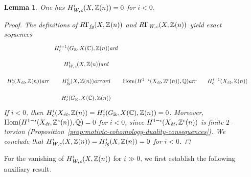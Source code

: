 \documentclass[leqno,12pt]{article}
\theoremstyle{plain}
\newtheorem{lemma}[theorem]{\indent\sc Lemma}
\theoremstyle{definition}
\DeclareMathOperator{\Hom}{Hom}
\newcommand{\CC}{\mathbb{C}}
\newcommand{\QQ}{\mathbb{Q}}
\newcommand{\RR}{\mathbb{R}}
\newcommand{\ZZ}{\mathbb{Z}}
\newcommand{\Wc}{\text{\it W,c}}
\newcommand{\ar}{\text{\it ar}}
\newcommand{\et}{\text{\it \'{e}t}}
\newcommand{\fg}{\text{\it fg}}
\begin{document}
\begin{lemma}
  One has $H^i_\Wc (X,\ZZ(n)) = 0$ for $i < 0$.

  \begin{proof}
    The definitions of $R\Gamma_\fg (X, \ZZ(n))$ and $R\Gamma_\Wc (X, \ZZ(n))$
    yield exact sequences
    \[ \begin{tikzcd}[row sep=1em,column sep=1em]
        &[-1em] H^{i-1}_c (G_\RR, X (\CC), \ZZ (n)) \ar{d} &[-1em] \\
        & H^i_\Wc (X, \ZZ(n)) \ar{d} \\
        H^i_c (X_\et, \ZZ(n)) \ar{r} & H^i_\fg (X, \ZZ(n)) \ar{r}\ar{d} & \Hom (H^{1-i} (X_\et, \ZZ^c (n)), \QQ) \ar{r} & H^{i+1}_c (X_\et, \ZZ(n)) \\
        & H^i_c (G_\RR, X (\CC), \ZZ (n))
      \end{tikzcd} \]
    If $i < 0$, then
    $H^i_c (X_\et, \ZZ(n)) = H^i_c (G_\RR, X (\CC), \ZZ (n)) = 0$.
    Moreover, $\Hom (H^{1-i} (X_\et, \ZZ^c (n)), \QQ) = 0$ for $i < 0$, since
    $H^{1-i} (X_\et, \ZZ^c (n))$ is finite $2$-torsion
    (Proposition~\ref{prop:motivic-cohomology-duality-consequences}).  We
    conclude that $H^i_\Wc (X, \ZZ(n)) = H^i_\fg (X, \ZZ(n)) = 0$ for $i < 0$.
  \end{proof}
\end{lemma}

For the vanishing of $H^i_\Wc (X, \ZZ(n))$ for $i \gg 0$, we first establish the
following auxiliary result.
\end{document}
